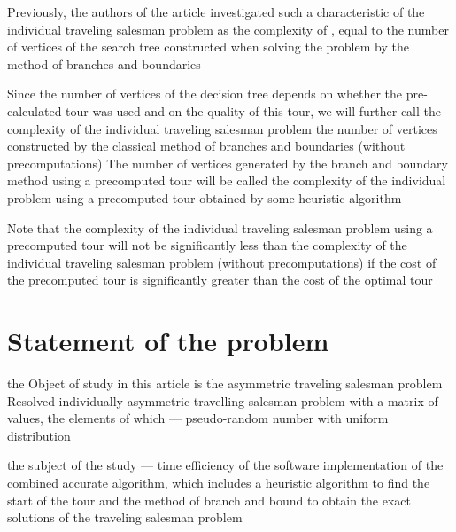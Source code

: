 \documentclass[12pt]{article}
\begin{document}
 
 Previously, \cite{SITO2016} the authors of the article investigated such a characteristic of the individual traveling salesman problem as the complexity of \cite{Knuth}, equal to the number of vertices of the search tree constructed when solving the problem by the method of branches and boundaries

 
 Since the number of vertices of the decision tree depends on whether the pre-calculated tour was used and on the quality of this tour, we will further call the complexity of the individual traveling salesman problem the number of vertices constructed by the classical method of branches and boundaries (without precomputations)
The number of vertices generated by the branch and boundary method using a precomputed tour will be called the complexity of the individual problem using a precomputed tour obtained by some heuristic algorithm
 
 
 Note that the complexity of the individual traveling salesman problem using a precomputed tour will not be significantly less than the complexity of the individual traveling salesman problem (without precomputations) if the cost of the precomputed tour is significantly greater than the cost of the optimal tour

 
 \section{Statement of the problem} 
 the Object of study in this article is the asymmetric traveling salesman problem
Resolved individually asymmetric travelling salesman problem with a matrix of values, the elements of which --- pseudo-random number with uniform distribution

 
 the subject of the study --- time efficiency of the software implementation of the combined accurate algorithm, which includes a heuristic algorithm to find the start of the tour and the method of branch and bound to obtain the exact solutions of the traveling salesman problem
\end{document}
